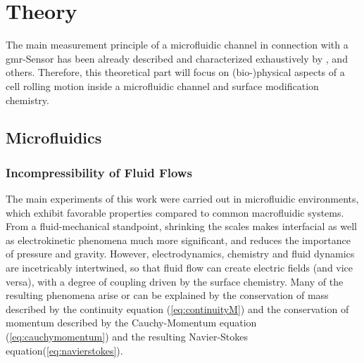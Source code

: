 \setcounter{page}{1}
\chapter{Theory}
The main measurement principle of a microfluidic channel in connection with a \gls{gmr}-Sensor has been already described and characterized exhaustively by \citet{lit:thes:helou}, \citet{lit:thes:reisbeck} and others.\cite{lit:thes:esthi,lit:thes:brenner} Therefore, this theoretical part will focus on (bio-)physical aspects of a cell rolling motion inside a microfluidic channel and surface modification chemistry.

\section{Microfluidics}

\subsection{Incompressibility of Fluid Flows}

The main experiments of this work were carried out in microfluidic environments, which exhibit favorable properties compared to common macrofluidic systems. From a fluid-mechanical standpoint, shrinking the scales makes interfacial as well as electrokinetic phenomena much more significant, and reduces the importance of pressure and gravity.\cite{lit:fluidic:kirby} However, electrodynamics, chemistry and fluid dynamics are incetricably intertwined, so that fluid flow can create electric fields (and vice versa), with a degree of coupling driven by the surface chemistry. Many of the resulting phenomena arise or can be explained by the conservation of mass described by the continuity equation (\cref{eq:continuityM}) and the conservation of momentum described by the Cauchy-Momentum equation (\cref{eq:cauchymomentum}) and the resulting Navier-Stokes equation(\cref{eq:navierstokes}).

